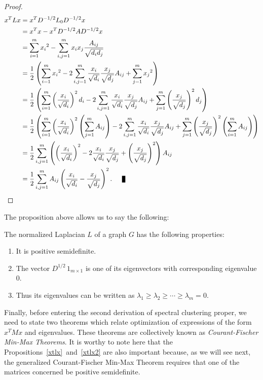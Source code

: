 \begin{proof}
   \begin{equation*} 
      \begin{split}
         x^TLx &= x^T D ^{-1/2} L_0 D^{-1/2} x \\
         &= x^Tx - x^TD^{-1/2}AD^{-1/2}x \\
         &= \sum_{i=1}^m {x_i}^2 - \sum_{i,j = 1}^m x_i  x_j \frac{A_{ij}}{\sqrt{d_i d_j}}  \\
         &= \frac{1}{2} \left( \sum_{i=1}^m {x_i}^2 - 2\sum_{i,j = 1}^m \frac{x_i}{\sqrt{d_i}} \frac{x_j}{\sqrt{d_j}} A_{ij} + \sum_{j=1}^m {x_j}^2 \right) \\
         &= \frac{1}{2} \left( \sum_{i=1}^m \left( \frac{x_i}{\sqrt{d_i}} \right) ^2 d_i - 2\sum_{i,j = 1}^m \frac{x_i}{\sqrt{d_i}} \frac{x_j}{\sqrt{d_j}} A_{ij} +  \sum_{j=1}^m \left( \frac{x_j}{\sqrt{d_j}} \right) ^2 d_j \right) \\
         &= \frac{1}{2} \left( \sum_{i=1}^m \left( \frac{x_i}{\sqrt{d_i}} \right) ^2 \left( \sum_{j=1}^m A_{ij} \right) - 2\sum_{i,j = 1}^m \frac{x_i}{\sqrt{d_i}} \frac{x_j}{\sqrt{d_j}} A_{ij} +  \sum_{j=1}^m \left( \frac{x_j}{\sqrt{d_j}} \right) ^2 \left( \sum_{i=1}^m A_{ij} \right) \right) \\
         &= \frac{1}{2} \sum_{i,j=1}^m \left( \left( \frac{x_i}{\sqrt{d_i}} \right)^2 - 2\frac{x_i}{\sqrt{d_i}}\frac{x_j}{\sqrt{d_j}} + \left( \frac{x_j}{\sqrt{d_j}} \right) ^2 \right) A_{ij} \\
         &= \frac{1}{2} \sum_{i,j=1}^m A_{ij} \left( \frac{x_i}{\sqrt{d_i}}- \frac{x_j}{\sqrt{d_j}} \right)^2. \qed
      \end{split}
   \end{equation*}
\end{proof}
   The proposition above allows us to say the following:
\begin{corollary}
   The normalized Laplacian $L$ of a graph $G$ has the following properties:
   \begin{enumerate}
      \item It is positive semidefinite.
      \item The vector $D^{1/2} \, 1_{m \times 1}$ is one of its eigenvectors with corresponding eigenvalue $0$.
      \item Thus its eigenvalues can be written as $\lambda_1 \ge \lambda_2 \ge \cdots \ge \lambda_m = 0$.
   \end{enumerate}
\end{corollary}
Finally, before entering the second derivation of spectral clustering proper, we need to state two theorems which relate optimization of expressions of the form $x^TMx$ and eigenvalues.
These theorems are collectively known as \textit{Courant-Fischer Min-Max Theorems}.
   It is worthy to note here that the Propositions~\ref{xtlx}~and~\vref{xtlx2} are also important because, as we will see next, the generalized Courant-Fischer Min-Max Theorem requires that one of the matrices concerned be positive semidefinite. 

